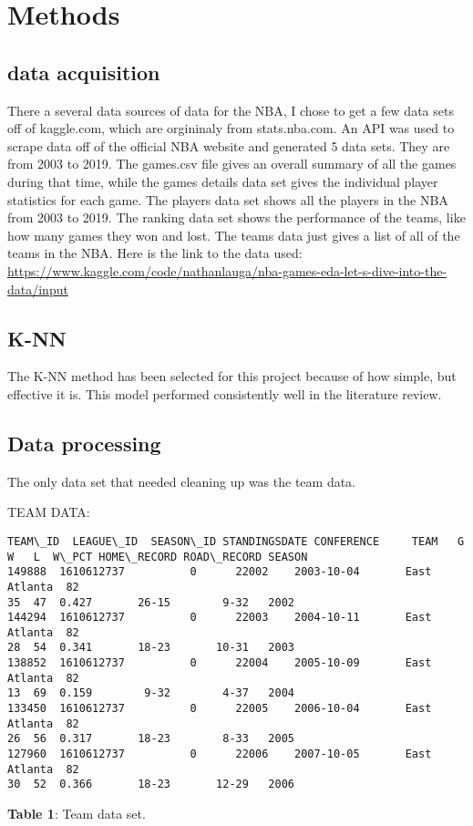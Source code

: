 \documentclass[11pt]{article}
\begin{document}
\section{Methods}

\subsection{data acquisition}

There a several data sources of data for the NBA, I chose to get a few data sets off of kaggle.com, which are orgininaly from stats.nba.com. An API was used to scrape data off of the official NBA website and generated 5 data sets. They are from 2003 to 2019. The games.csv file gives an overall summary of all the games during that time, while the games details data set gives the individual player statistics for each game. The players data set shows all the players in the NBA from 2003 to 2019. The ranking data set shows the performance of the teams, like how many games they won and lost. The teams data just gives a list of all of the teams in the NBA. Here is the link to the data used: \href{https://www.kaggle.com/code/nathanlauga/nba-games-eda-let-s-dive-into-the-data/input}{https://www.kaggle.com/code/nathanlauga/nba-games-eda-let-s-dive-into-the-data/input} 

\subsection{K-NN}
The K-NN method has been selected for this project because of how simple, but effective it is. This model performed consistently well in the literature review.


\subsection{Data processing}    
The only data set that needed cleaning up was the team data.

\medskip

 TEAM DATA:
    \begin{Verbatim}[commandchars=\\\{\}]
           TEAM\_ID  LEAGUE\_ID  SEASON\_ID STANDINGSDATE CONFERENCE     TEAM   G
W   L  W\_PCT HOME\_RECORD ROAD\_RECORD SEASON
149888  1610612737          0      22002    2003-10-04       East  Atlanta  82
35  47  0.427       26-15        9-32   2002
144294  1610612737          0      22003    2004-10-11       East  Atlanta  82
28  54  0.341       18-23       10-31   2003
138852  1610612737          0      22004    2005-10-09       East  Atlanta  82
13  69  0.159        9-32        4-37   2004
133450  1610612737          0      22005    2006-10-04       East  Atlanta  82
26  56  0.317       18-23        8-33   2005
127960  1610612737          0      22006    2007-10-05       East  Atlanta  82
30  52  0.366       18-23       12-29   2006
    \end{Verbatim}
\centering\textbf{Table 1}: Team data set.
\end{document}
